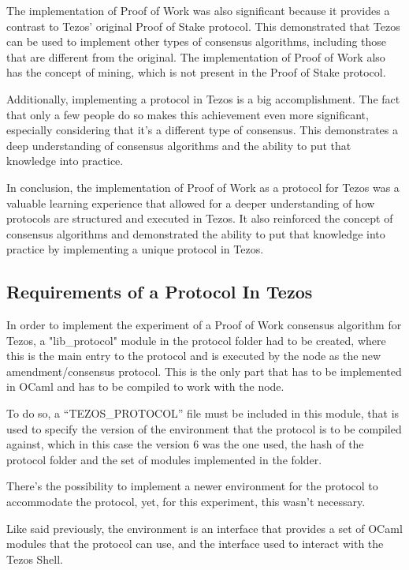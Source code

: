 The implementation of Proof of Work was also significant because it provides a contrast to Tezos' original Proof of Stake protocol. This demonstrated that Tezos can be used to implement other types of consensus algorithms, including those that are different from the original. The implementation of Proof of Work also has the concept of mining, which is not present in the Proof of Stake protocol.


Additionally, implementing a protocol in Tezos is a big accomplishment. The fact that only a few people do so makes this achievement even more significant, especially considering that it's a different type of consensus. This demonstrates a deep understanding of consensus algorithms and the ability to put that knowledge into practice.



In conclusion, the implementation of Proof of Work as a protocol for Tezos was a valuable learning experience that allowed for a deeper understanding of how protocols are structured and executed in Tezos. It also reinforced the concept of consensus algorithms and demonstrated the ability to put that knowledge into practice by implementing a unique protocol in Tezos.


\subsection*{Requirements of a Protocol In Tezos}
In order to implement the experiment of a Proof of Work consensus algorithm for Tezos, a "lib\_protocol" module in the protocol folder had to be created, where this is the main entry to the protocol and is executed by the node as the new amendment/consensus protocol. This is the only part that has to be implemented in OCaml and has to be compiled to work with the node.

To do so, a ``TEZOS\_PROTOCOL'' file must be included in this module, that is used to specify the version of the environment that the protocol is to be compiled against, which in this case the version 6 was the one used, the hash of the protocol folder and the set of modules implemented in the folder. 

There's the possibility to implement a newer environment for the protocol to accommodate the protocol, yet, for this experiment, this wasn't necessary. 

Like said previously, the environment is an interface that provides a set of OCaml modules that the protocol can use, and the interface used to interact with the Tezos Shell.

